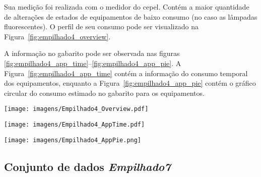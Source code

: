 Sua medição foi realizada com o medidor do \acs{cepel}. Contém a maior
quantidade de alterações de estados de equipamentos de baixo consumo (no
caso as lâmpadas fluorescentes). O
perfil de seu consumo pode ser visualizado na
Figura~\ref{fig:empilhado4_overview}.

A informação no gabarito pode ser observada nas figuras
\ref{fig:empilhado4_app_time}--\ref{fig:empilhado4_app_pie}. 
A Figura~\ref{fig:empilhado4_app_time} contém a informação do consumo
temporal dos equipamentos, enquanto a Figura~\ref{fig:empilhado4_app_pie}
contém o gráfico circular do consumo estimado no gabarito para os
equipamentos.


\begin{sidewaysfigure}[p]
\centering
\texttt{[image: imagens/Empilhado4\_Overview.pdf]}
\caption{Perfil de consumo para o conjunto de dados \emph{Empilhado4}.}
\label{fig:empilhado4_overview}
\end{sidewaysfigure}

\begin{sidewaysfigure}[p]
\centering
\texttt{[image: imagens/Empilhado4\_AppTime.pdf]}
\caption{Informação no gabarito para o conjunto de dados
\emph{Empilhado4}: consumo temporal dos equipamentos.}
\label{fig:empilhado4_app_time}
\end{sidewaysfigure}

\begin{sidewaysfigure}[p]
\centering
\texttt{[image: imagens/Empilhado4\_AppPie.png]}
\caption{Informação no gabarito para o conjunto de dados
\emph{Empilhado4}: gráfico circular do consumo dos equipamentos.}
\label{fig:empilhado4_app_pie}
\end{sidewaysfigure}

\FloatBarrier

\subsection{Conjunto de dados \emph{Empilhado7}}
\label{ssec:emp7}


